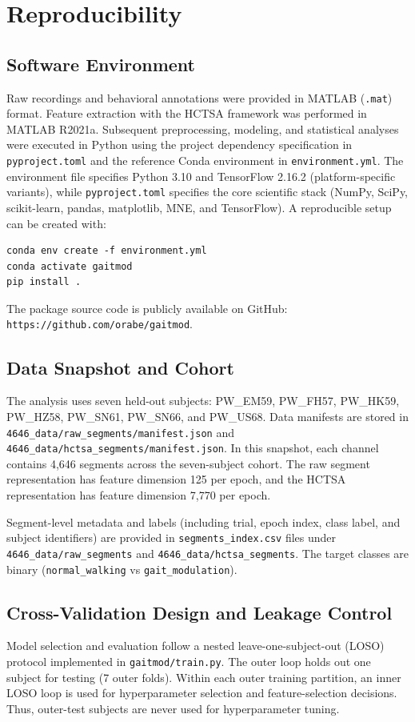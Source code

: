 \chapter{Reproducibility}
\label{sec:reproducibility}

\section{Software Environment}
\label{sec:reproducibility_software_environment}
Raw recordings and behavioral annotations were provided in MATLAB (\texttt{.mat}) format. Feature extraction with the HCTSA framework was performed in MATLAB R2021a. Subsequent preprocessing, modeling, and statistical analyses were executed in Python using the project dependency specification in \texttt{pyproject.toml} and the reference Conda environment in \texttt{environment.yml}. The environment file specifies Python 3.10 and TensorFlow 2.16.2 (platform-specific variants), while \texttt{pyproject.toml} specifies the core scientific stack (NumPy, SciPy, scikit-learn, pandas, matplotlib, MNE, and TensorFlow). A reproducible setup can be created with:
\begin{verbatim}
conda env create -f environment.yml
conda activate gaitmod
pip install .
\end{verbatim}
The package source code is publicly available on GitHub: \texttt{https://github.com/orabe/gaitmod}.

\section{Data Snapshot and Cohort}
\label{sec:reproducibility_data_snapshot}
The analysis uses seven held-out subjects: PW\_EM59, PW\_FH57, PW\_HK59, PW\_HZ58, PW\_SN61, PW\_SN66, and PW\_US68. Data manifests are stored in \texttt{4646\_data/raw\_segments/manifest.json} and \texttt{4646\_data/hctsa\_segments/manifest.json}. In this snapshot, each channel contains 4,646 segments across the seven-subject cohort. The raw segment representation has feature dimension 125 per epoch, and the HCTSA representation has feature dimension 7,770 per epoch.

Segment-level metadata and labels (including trial, epoch index, class label, and subject identifiers) are provided in \texttt{segments\_index.csv} files under \texttt{4646\_data/raw\_segments} and \texttt{4646\_data/hctsa\_segments}. The target classes are binary (\texttt{normal\_walking} vs \texttt{gait\_modulation}).

\section{Cross-Validation Design and Leakage Control}
\label{sec:reproducibility_cv_design}
Model selection and evaluation follow a nested leave-one-subject-out (LOSO) protocol implemented in \texttt{gaitmod/train.py}. The outer loop holds out one subject for testing (7 outer folds). Within each outer training partition, an inner LOSO loop is used for hyperparameter selection and feature-selection decisions. Thus, outer-test subjects are never used for hyperparameter tuning.

